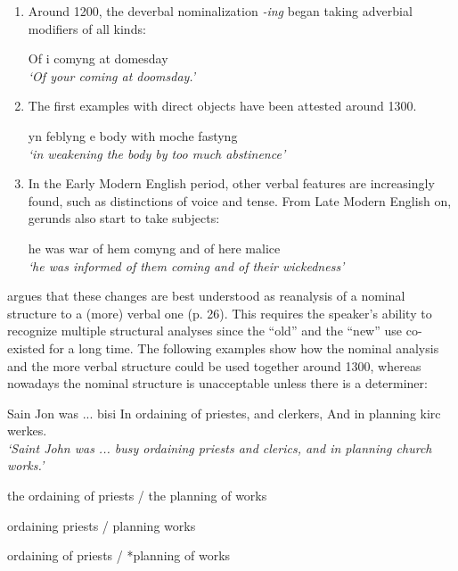 \begin{enumerate}
\item Around 1200, the deverbal nominalization \emph{-ing} began taking adverbial modifiers of all kinds:

\ea
Of \th i comyng at domesday\\
{\em `Of your coming \emph{at doomsday}.'}
\z

\item The first examples with direct objects have been attested around 1300.

\ea
yn feblyng \th e body with moche fastyng
\\ {\em `in weakening the body by too much abstinence'}
\z

\item In the Early Modern English period, other verbal features are increasingly found, such as distinctions of voice and tense. From Late Modern English on, gerunds also start to take subjects:

\ea 
he was war of hem comyng and of here malice \\
{\em `he was informed of them coming and of their wickedness'}
\z
\end{enumerate}

\citet{fanego04reanalysis} argues that these changes are best understood as reanalysis of a nominal structure to a (more) verbal one (p. 26). This requires the speaker's ability to recognize multiple structural analyses since the ``old'' and the ``new'' use co-existed for a long time. The following examples show how the nominal analysis and the more verbal structure could be used together around 1300, whereas nowadays the nominal structure is unacceptable unless there is a determiner:

\ea
\label{e:gerund-last}
Sain Jon was ... bisi In ordaining of priestes, and clerkers, And in planning kirc werkes.\\
{\em `Saint John was ... busy ordaining priests and clerics, and in planning church works.'}

\item the ordaining of priests / the planning of works
\item ordaining priests / planning works
\item *ordaining of priests / *planning of works
\z

